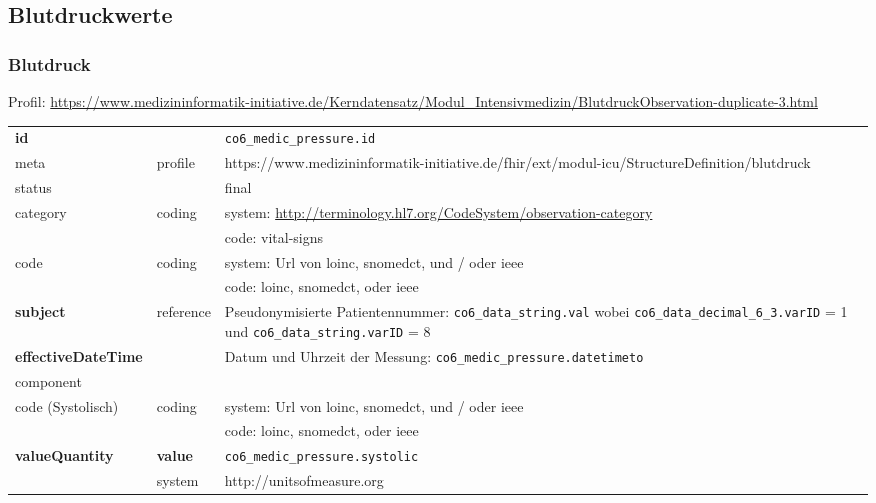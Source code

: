 \subsection{Blutdruckwerte}

\subsubsection{Blutdruck}

Profil: \url{https://www.medizininformatik-initiative.de/Kerndatensatz/Modul_Intensivmedizin/BlutdruckObservation-duplicate-3.html}

\begin{longtable}{|l|l|p{7.5cm}|}
        \hline
        \rowcolor{lightgray} \multicolumn{3}{|l|}{Data Mapping (inhaltlich)} \\ \hline
        \textbf{id} &  & \texttt{co6\_medic\_pressure.id} \\ \hline
	meta & profile & https://www.medizininformatik-initiative.de/fhir/ext/modul-icu/StructureDefinition/blutdruck \\ \hline 
	status &  & final  \\ \hline 
	category & coding & system: \url{http://terminology.hl7.org/CodeSystem/observation-category} \\ 
\cline{3-3}
        & & code: vital-signs \\ \hline
        code & coding & system: Url von \ac{loinc}, \ac{snomedct}, und / oder \ac{ieee} \\
        \cline{3-3}
         &  & code: \ac{loinc}, \ac{snomedct}, oder \ac{ieee} \\ \hline
        \textbf{subject} & reference & Pseudonymisierte Patientennummer: \texttt{co6\_data\_string.val} wobei \texttt{co6\_data\_decimal\_6\_3.varID} = 1 und \texttt{co6\_data\_string.varID} = 8 \\ \hline
        \textbf{effectiveDateTime} & & Datum und Uhrzeit der Messung:  \texttt{co6\_medic\_pressure.datetimeto} \\ \hline
	\multicolumn{3}{|l|}{component} \\ \hline
	code (Systolisch)  & coding & system: Url von \ac{loinc}, \ac{snomedct}, und / oder \ac{ieee} \\ 
	\cline{3-3} 
	&  & code: \ac{loinc}, \ac{snomedct}, oder \ac{ieee} \\ \hline	
	\textbf{valueQuantity} & \textbf{value} & \texttt{co6\_medic\_pressure.systolic} \\
	\cline{2-3}
	& system & http://unitsofmeasure.org \\ 

\end{longtable}
